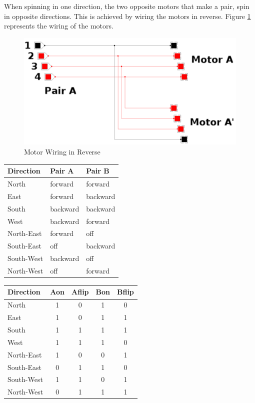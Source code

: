 When spinning in one direction, the two opposite motors that make a pair, spin in opposite 
directions. This is achieved by wiring the motors in reverse. Figure \ref{fig:reverse_wiring}
represents the wiring of the motors.
\begin{figure}[htp]
	\centering
	\includegraphics[width=\textwidth]{figures/move/motor_pairs_cedar.png}
	\caption{Motor Wiring in Reverse}
	\label{fig:reverse_wiring}
\end{figure}
\begin{center}
	\begin{tabular}{|l|l|l|}
		\hline
		Direction & Pair A & Pair B	\\
		\hline
		North & forward & forward \\
		East 	& forward & backward \\
		South & backward & backward \\
		West 	& backward & forward \\
		\hline
		North-East & forward & off \\
		South-East & off & backward \\
		South-West & backward & off\\
		North-West & off & forward \\
		\hline
	\end{tabular}
	\begin{tabular}{|l|c|c|c|c|}
		\hline
		Direction & Aon & Aflip & Bon & Bflip \\
		\hline
		North & 1 & 0 & 1 & 0 \\
		East 	& 1 & 0 & 1 & 1 \\
		South & 1 & 1 & 1 & 1 \\
		West 	& 1 & 1 & 1 & 0 \\
		\hline
		North-East & 1 & 0 & 0 & 1 \\
		South-East & 0 & 1 & 1 & 0 \\
		South-West & 1 & 1 & 0 & 1 \\
		North-West & 0 & 1 & 1 & 1 \\
		\hline
	\end{tabular}
	\label{table:directions}
\end{center}